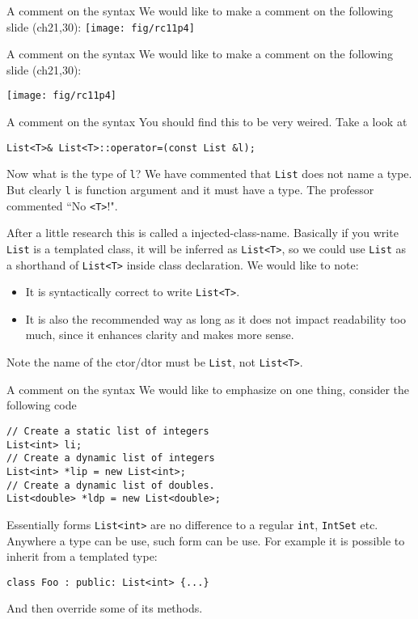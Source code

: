 \begin{frame}[fragile]{A comment on the syntax}
We would like to make a comment on the following slide (ch21,30):
\texttt{[image: fig/rc11p4]}
\end{frame}

\begin{frame}[fragile]{A comment on the syntax}
We would like to make a comment on the following slide (ch21,30):

\vspace{0.1in}
\texttt{[image: fig/rc11p4]}
\end{frame}

\begin{frame}[fragile]{A comment on the syntax}
You should find this to be very weired. Take a look at 
\begin{verbatim}
List<T>& List<T>::operator=(const List &l);
\end{verbatim}
Now what is the type of \texttt{l}? We have commented that \texttt{List} does not name a type. But clearly \texttt{l} is function argument and it must have a type. The professor commented ``No \texttt{<T>}!".

After a little research this is called a injected-class-name. Basically if you write \texttt{List} is a templated class, it will be inferred as \texttt{List<T>}, so we could use \texttt{List} as a shorthand of \texttt{List<T>} inside class declaration. We would like to note:
\begin{itemize}
	\item It is syntactically correct to write \texttt{List<T>}.
	\item It is also the recommended way as long as it does not impact readability too much, since it enhances clarity and makes more sense.
\end{itemize}
\alert{Note the name of the ctor/dtor must be \texttt{List}, not \texttt{List<T>}}.
\end{frame}

\begin{frame}[fragile]{A comment on the syntax}
We would like to emphasize on one thing, consider the following code
\begin{verbatim}
// Create a static list of integers
List<int> li;
// Create a dynamic list of integers
List<int> *lip = new List<int>;
// Create a dynamic list of doubles.
List<double> *ldp = new List<double>;
\end{verbatim}
Essentially forms \texttt{List<int>} are no difference to a regular \texttt{int}, \texttt{IntSet} etc. Anywhere a type can be use, such form can be use. For example it is possible to inherit from a templated type:
\begin{verbatim}
class Foo : public: List<int> {...}
\end{verbatim}
And then override some of its methods. 
\end{frame}

